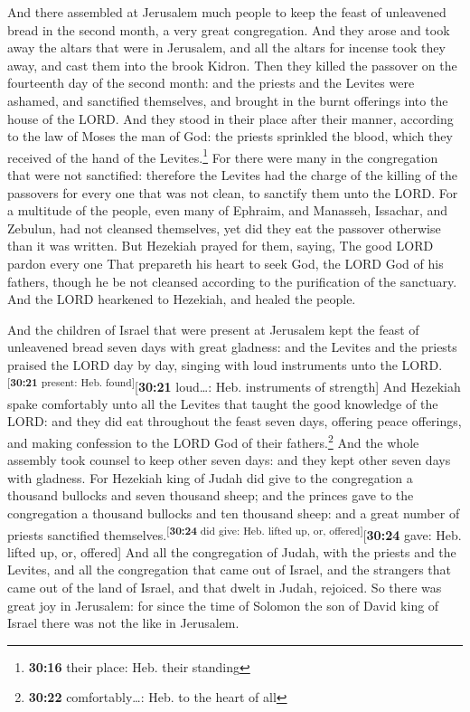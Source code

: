  And there assembled at Jerusalem much people to keep the
feast of unleavened bread in the second month, a very great
congregation.  And they arose and took away the altars
that were in Jerusalem, and all the altars for incense took they away,
and cast them into the brook Kidron.  Then they killed
the passover on the fourteenth day of the second month: and the priests
and the Levites were ashamed, and sanctified themselves, and brought in
the burnt offerings into the house of the LORD.  And they
stood in their place after their manner, according to the law of Moses
the man of God: the priests sprinkled the blood, which they received of
the hand of the Levites.\footnote{\textbf{30:16} their place: Heb. their
  standing}  For there were many in the congregation that
were not sanctified: therefore the Levites had the charge of the killing
of the passovers for every one that was not clean, to sanctify them unto
the LORD.  For a multitude of the people, even many of
Ephraim, and Manasseh, Issachar, and Zebulun, had not cleansed
themselves, yet did they eat the passover otherwise than it was written.
But Hezekiah prayed for them, saying, The good LORD pardon every one
 That prepareth his heart to seek God, the LORD God of
his fathers, though he be not cleansed according to the purification of
the sanctuary.  And the LORD hearkened to Hezekiah, and
healed the people.

 And the children of Israel that were present at
Jerusalem kept the feast of unleavened bread seven days with great
gladness: and the Levites and the priests praised the LORD day by day,
singing with loud instruments unto the
LORD.\textsuperscript{{[}\textbf{30:21} present: Heb.
found{]}}{[}\textbf{30:21} loud\ldots: Heb. instruments of strength{]}
 And Hezekiah spake comfortably unto all the Levites that
taught the good knowledge of the LORD: and they did eat throughout the
feast seven days, offering peace offerings, and making confession to the
LORD God of their fathers.\footnote{\textbf{30:22} comfortably\ldots:
  Heb. to the heart of all}  And the whole assembly took
counsel to keep other seven days: and they kept other seven days with
gladness.  For Hezekiah king of Judah did give to the
congregation a thousand bullocks and seven thousand sheep; and the
princes gave to the congregation a thousand bullocks and ten thousand
sheep: and a great number of priests sanctified
themselves.\textsuperscript{{[}\textbf{30:24} did give: Heb. lifted up,
or, offered{]}}{[}\textbf{30:24} gave: Heb. lifted up, or, offered{]}
 And all the congregation of Judah, with the priests and
the Levites, and all the congregation that came out of Israel, and the
strangers that came out of the land of Israel, and that dwelt in Judah,
rejoiced.  So there was great joy in Jerusalem: for since
the time of Solomon the son of David king of Israel there was not the
like in Jerusalem.

